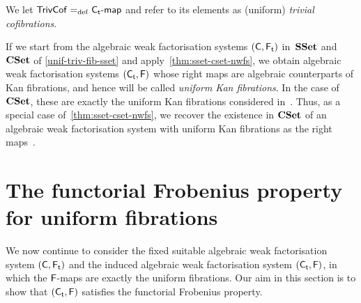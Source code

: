 \documentclass[reqno,10pt,a4paper,oneside,draft]{amsart}
\begin{document}
{{We let $\mathsf{TrivCof} =_{\operatorname{def}} {\mathsf{C_t}}\text{-}\mathsf{map}$ and refer to its elements as (uniform) \emph{trivial cofibrations}. 




\begin{example} \label{unif-fib-sset} If we start from the algebraic weak factorisation systems $(\mathsf{C}, \mathsf{F_t})$ in~$\mathbf{SSet}$ and~$\mathbf{CSet}$ of \cref{unif-triv-fib-sset}
and apply~\cref{thm:sset-cset-nwfs}, we obtain algebraic weak factorisation systems $(\mathsf{C_t}, \mathsf{F})$ whose right maps are algebraic counterparts of Kan fibrations,
and hence will be called \emph{uniform Kan fibrations}. In the case of $\mathbf{CSet}$, these are  exactly the uniform Kan fibrations considered in~\cite{cohen-et-al:cubicaltt}. 
Thus,  as a special case of~\cref{thm:sset-cset-nwfs}, we recover the existence in $\mathbf{CSet}$ of an algebraic weak factorisation system with uniform Kan fibrations as the right 
maps~\cite{cohen-et-al:cubicaltt,swan-awfs}.
\end{example} 




\section{The functorial Frobenius property for uniform fibrations}
\label{sec:frocuf}


We now continue to consider the fixed suitable algebraic weak factorisation system $(\mathsf{C}, \mathsf{F_t})$ and the induced 
algebraic weak factorisation system $(\mathsf{C_t}, \mathsf{F})$, in which the $\mathsf{F}$-maps are exactly the
uniform fibrations. Our aim in this section is to show that $(\mathsf{C_t}, \mathsf{F})$ satisfies the functorial
Frobenius property. 

}}
\end{document}
